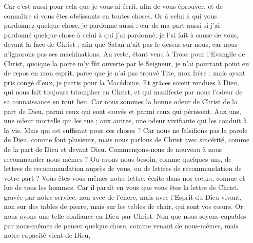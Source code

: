 \begin{multicols}{2}
Car c'est aussi pour cela que je vous ai écrit, afin de vous éprouver, et de connaître si vous êtes obéissants en toutes choses.
Or à celui à qui vous pardonnez quelque chose, je pardonne aussi ; car de ma part aussi si j'ai pardonné quelque chose à celui à qui j'ai pardonné, je l'ai fait à cause de vous, devant la face de Christ ;
afin que Satan n'ait pas le dessus sur nous, car nous n'ignorons pas ses machinations.
Au reste, étant venu à Troas pour l'Evangile de Christ, quoique la porte m'y fût ouverte par le Seigneur, je n'ai pourtant point eu de repos en mon esprit, parce que je n'ai pas trouvé Tite, mon frère ;
mais ayant pris congé d'eux, je partis pour la Macédoine.
Et grâces soient rendues à Dieu, qui nous fait toujours triompher en Christ, et qui manifeste par nous l'odeur de sa connaissance en tout lieu.
Car nous sommes la bonne odeur de Christ de la part de Dieu, parmi ceux qui sont sauvés et parmi ceux qui périssent.
Aux uns, une odeur mortelle qui les tue ; aux autres, une odeur vivifiante qui les conduit à la vie. Mais qui est suffisant pour ces choses ?
Car nous ne falsifions pas la parole de Dieu, comme font plusieurs, mais nous parlons de Christ avec sincérité, comme de la part de Dieu et devant Dieu.
\VerseOne{}Commençons-nous de nouveau à nous recommander nous-mêmes ? Ou avons-nous besoin, comme quelques-uns, de lettres de recommandation auprès de vous, ou de lettres de recommandation de votre part ?
Vous êtes vous-mêmes notre lettre, écrite dans nos cœurs, connue et lue de tous les hommes.
Car il paraît en vous que vous êtes la lettre de Christ, gravée par notre service, non avec de l'encre, mais avec l'Esprit du Dieu vivant, non sur des tables de pierre, mais sur les tables de chair, qui sont vos cœurs.
Or nous avons une telle confiance en Dieu par Christ.
Non que nous soyons capables par nous-mêmes de penser quelque chose, comme venant de nous-mêmes, mais notre capacité vient de Dieu,

\end{multicols}
